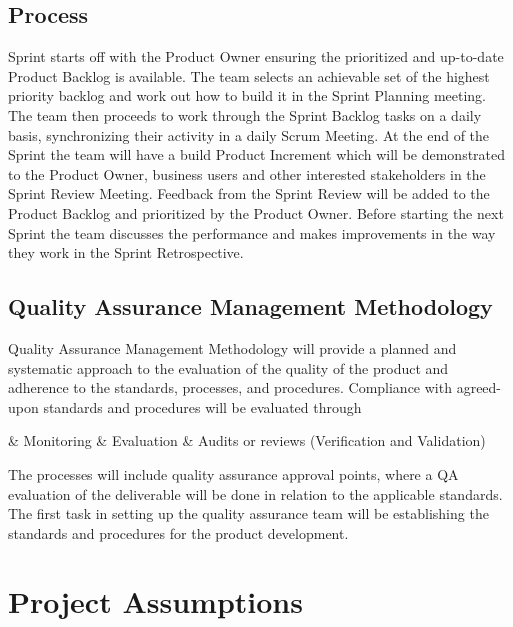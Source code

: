 \documentclass[a4paper]{article}
\begin{document}
	\subsection{Process}
	Sprint starts off with the Product Owner ensuring the prioritized and up-to-date Product Backlog is available. The team selects an achievable set of the highest priority backlog and work out how to build it in the Sprint Planning meeting. The team then proceeds to work through the Sprint Backlog tasks on a daily basis, synchronizing their activity in a daily Scrum Meeting. At the end of the Sprint the team will have a build Product Increment which will be demonstrated to the Product Owner, business users and other interested stakeholders in the Sprint Review Meeting. Feedback from the Sprint Review will be added to the Product Backlog and prioritized by the Product Owner. Before starting the next Sprint the team discusses the performance and makes improvements in the way they work in the Sprint Retrospective.
	
	\subsection{Quality Assurance Management Methodology}
	Quality Assurance Management Methodology will provide a planned and systematic approach to the evaluation of the quality of the product and adherence to the standards, processes, and procedures. Compliance with agreed-upon standards and procedures will be evaluated through	
	
	\begin{easylist}
		& \thinspace Monitoring
		& \thinspace Evaluation
		& \thinspace Audits or reviews (Verification and Validation)
	\end{easylist}\par
	\bigskip
	\noindent
	The processes will include quality assurance approval points, where a QA evaluation of the deliverable will be done in relation to the applicable standards. The first task in setting up the quality assurance team will be establishing the standards and procedures for the product development.
	
	\newpage
	
	\section{Project Assumptions}
\end{document}

